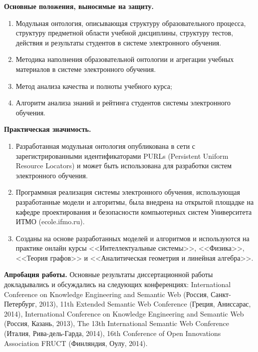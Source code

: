 \textbf{Основные положения, выносимые на защиту.}
\begin{enumerate}
 \item Модульная онтология, описывающая структуру образовательного процесса, структуру предметной области учебной дисциплины, структуру тестов, действия и результаты студентов в системе электронного обучения.
 \item Методика наполнения образовательной онтологии и агрегации учебных материалов в системе электронного обучения.
 \item Метод анализа качества и полноты учебного курса;
 \item Алгоритм анализа знаний и рейтинга студентов системы электронного обучения.
 \end{enumerate}


\textbf{Практическая значимость.}
\begin{enumerate}
 \item Разработанная модульная онтология опубликована в сети с зарегистрированными идентификаторами PURLs (Persistent Uniform Resource Locators) и может быть использована для разработки систем электронного обучения.
 \item Программная реализация системы электронного обучения, использующая разработанные модели и алгоритмы, была внедрена на открытой площадке на кафедре проектирования и безопасности компьютерных систем Университета ИТМО (ecole.ifmo.ru). 
 \item Созданы на основе разработанных моделей и алгоритмов и используются на практике онлайн курсы 
<<Интеллектуальные системы>>, <<Физика>>, <<Теория графов>> и <<Аналитическая геометрия и линейная алгебра>>.
 \end{enumerate}
 
 


\textbf{Апробация работы.}
Основные результаты диссертационной работы докладывались и обсуждались на следующих конференциях:
International Conference on Knowledge Engineering and Semantic Web (Россия, Санкт-Петербург, 2013),
11th Extended Semantic Web Conference (Греция, Аниссарас, 2014), International Conference on Knowledge Engineering and Semantic Web (Россия, Казань, 2013), The 13th International Semantic Web Conference (Италия, Рива-дель-Гарда, 2014), 16th Conference of Open
Innovations Association FRUCT (Финляндия, Оулу, 2014).


